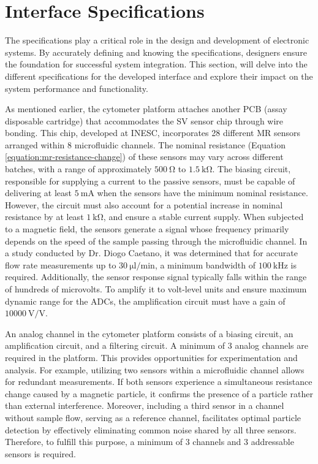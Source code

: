 
\section{Interface Specifications}
\label{section:mfc-specifications}

The specifications play a critical role in the design and development of electronic systems. By accurately defining and knowing the specifications, designers ensure the foundation for successful system integration. This section, will delve into the different specifications for the developed interface and explore their impact on the system performance and functionality.

As mentioned earlier, the cytometer platform attaches another \ac{PCB} (assay disposable cartridge) that accommodates the \ac{SV} sensor chip through wire bonding. This chip, developed at \ac{INESC}, incorporates 28 different \ac{MR} sensors arranged within 8 microfluidic channels. The nominal resistance (Equation \ref{equation:mr-resistance-change}) of these sensors may vary across different batches, with a range of approximately $\mathrm{500~\Omega}$ to $\mathrm{1.5~k\Omega}$. The biasing circuit, responsible for supplying a current to the passive sensors, must be capable of delivering at least $\mathrm{5~mA}$ when the sensors have the minimum nominal resistance. However, the circuit must also account for a potential increase in nominal resistance by at least $\mathrm{1~k\Omega}$, and ensure a stable current supply. When subjected to a magnetic field, the sensors generate a signal whose frequency primarily depends on the speed of the sample passing through the microfluidic channel. In a study \cite{DiogoC_thesis} conducted by Dr. Diogo Caetano, it was determined that for accurate flow rate measurements up to $\mathrm{30~\mu l/min}$, a minimum bandwidth of $\mathrm{100~kHz}$ is required. Additionally, the sensor response signal typically falls within the range of hundreds of microvolts. To amplify it to volt-level units and ensure maximum dynamic range for the \ac{ADC}s, the amplification circuit must have a gain of $\mathrm{10000~V/V}$.

An analog channel in the cytometer platform consists of a biasing circuit, an amplification circuit, and a filtering circuit. A minimum of 3 analog channels are required in the platform. This provides opportunities for experimentation and analysis. For example, utilizing two sensors within a microfluidic channel allows for redundant measurements. If both sensors experience a simultaneous resistance change caused by a magnetic particle, it confirms the presence of a particle rather than external interference. Moreover, including a third sensor in a channel without sample flow, serving as a reference channel, facilitates optimal particle detection by effectively eliminating common noise shared by all three sensors. Therefore, to fulfill this purpose, a minimum of 3 channels and 3 addressable sensors is required.

